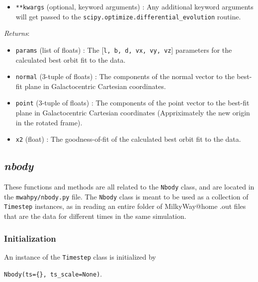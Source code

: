 \documentclass{article}
\begin{document}
\begin{itemize}
\begin{itemize}
\item \verb!**kwargs! (optional, keyword arguments) : Any additional keyword arguments will get passed to the \verb!scipy.optimize.differential_evolution! routine. 

\end{itemize}

\textit{Returns}: \begin{itemize} 

\item \verb!params! (list of floats) : The [\verb!l, b, d, vx, vy, vz!] parameters for the calculated best orbit fit to the data.

\item \verb!normal! (3-tuple of floats) : The components of the normal vector to the best-fit plane in Galactocentric Cartesian coordinates. 

\item \verb!point! (3-tuple of floats) : The components of the point vector to the best-fit plane in Galactocentric Cartesian coordinates  (Appriximately the new origin in the rotated frame). 

\item \verb!x2! (float) : The goodness-of-fit of the calculated best orbit fit to the data.

\end{itemize}



\end{itemize}



\subsection{\textit{nbody}}

These functions and methods are all related to the \verb!Nbody! class, and are located in the \verb!mwahpy/nbody.py! file. The \verb!Nbody! class is meant to be used as a collection of \verb!Timestep! instances, as in reading an entire folder of MilkyWay@home .out files that are the data for different times in the same simulation. 

\subsubsection{Initialization}

An instance of the \verb!Timestep! class is initialized by 

\verb!Nbody(ts={}, ts_scale=None)!.
\end{document}
